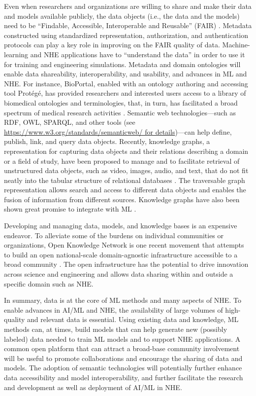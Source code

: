 Even when researchers and organizations are willing to share and make their data and models available publicly, the data objects (i.e., the data and the models) need to be ``Findable, Accessible, Interoperable and Reusable'' (FAIR) \citep{wilkinson2016fair}. Metadata constructed using standardized representation, authorization, and authentication protocols can play a key role in improving on the FAIR quality of data. Machine-learning and NHE applications have to ``understand the data'' in order to use it for training and engineering simulations. Metadata and domain ontologies will enable data shareability, interoperability, and usability, and advances in ML and NHE. For instance, BioPortal, enabled with an ontology authoring and accessing tool Protégé, has provided researchers and interested users access to a library of biomedical ontologies and terminologies, that, in turn, has facilitated a broad spectrum of medical research activities \citep{whetzel2011bioportal}. Semantic web technologies---such as RDF, OWL, SPARQL, and other tools (see \url{https://www.w3.org/standards/semanticweb/ for details})---can help define, publish, link, and query data objects. Recently, knowledge graphs, a representation for capturing data objects and their relations describing a domain or a field of study, have been proposed to manage and to facilitate retrieval of unstructured data objects, such as video, images, audio, and text, that do not fit neatly into the tabular structure of relational databases \citep{paulheim2016knowledge, bonatti2018knowledge, reinanda2020knowledge}. The traversable graph representation allows search and access to different data objects and enables the fusion of information from different sources. Knowledge graphs have also been shown great promise to integrate with ML \citep{lin2018multihop}.

Developing and managing data, models, and knowledge bases is an expensive endeavor. To alleviate some of the burdens on individual communities or organizations, Open Knowledge Network is one recent movement that attempts to build an open national-scale domain-agnostic infrastructure accessible to a broad community \citep{baru2017open}. The open infrastructure has the potential to drive innovation across science and engineering and allows data sharing within and outside a specific domain such as NHE.

In summary, data is at the core of ML methods and many aspects of NHE. To enable advances in AI/ML and NHE, the availability of large volumes of high-quality and relevant data is essential. Using existing data and knowledge, ML methods can, at times, build models that can help generate new (possibly labeled) data needed to train ML models and to support NHE applications. A common open platform that can attract a broad-base community involvement will be useful to promote collaborations and encourage the sharing of data and models. The adoption of semantic technologies will potentially further enhance data accessibility and model interoperability, and further facilitate the research and development as well as deployment of AI/ML in NHE. 

